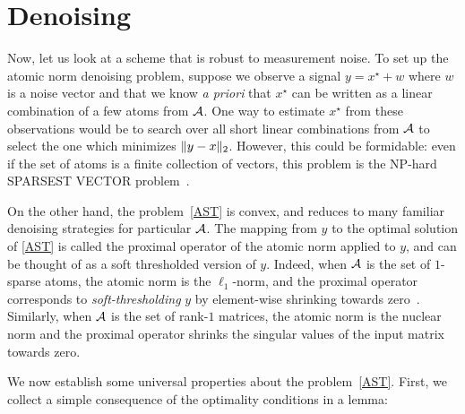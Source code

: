 \section{Denoising}
\label{sec:abstract-denoising}

Now, let us look at a scheme that is robust to measurement noise. To set up the
atomic norm denoising problem, suppose we observe a signal $y = x^\star + w$
where $w$ is a noise vector and that we know \emph{a priori} that $x^\star$ can
be written as a linear combination of a few atoms from $\mathcal{A}$. One way to estimate
$x^\star$ from these observations would be to search over all short linear
combinations from $\mathcal{A}$ to select the one which minimizes $\lVert y- x\rVert_2$.
However, this could be formidable: even if the set of atoms is a finite
collection of vectors, this problem is the NP-hard SPARSEST VECTOR
problem~\cite{Natarajan95}.

On the other hand, the problem~\eqref{AST} is convex, and reduces to many
familiar denoising strategies for particular $\mathcal{A}$. The mapping from $y$ to the
optimal solution of \eqref{AST} is called the proximal operator of the atomic
norm applied to $y$, and can be thought of as a soft thresholded version of $y$.
Indeed, when $\mathcal{A}$ is the set of $1$-sparse atoms, the atomic norm is the
$\ell_1$-norm, and the proximal operator corresponds to \emph{soft-thresholding}
$y$ by element-wise shrinking towards zero~\cite{donoho1995noising}. Similarly,
when $\mathcal{A}$ is the set of rank-$1$ matrices, the atomic norm is the nuclear norm
and the proximal operator shrinks the singular values of the input matrix
towards zero.

We now establish some universal properties about the problem~\eqref{AST}.
First, we collect a simple consequence of the optimality conditions in a lemma:


